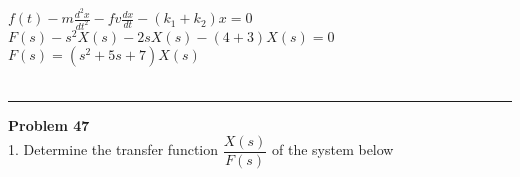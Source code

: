 \documentclass[11pt,letterpaper]{article}
\begin{document}
			$f(t)-m\frac{d^2x}{dt^2}-fv\frac{dx}{dt}-(k_1+k_2)x=0$\\

			$F(s)-s^2X(s)-2sX(s)-(4+3)X(s)=0$\\
			
			$F(s)=(s^2+5s+7)X(s)$\\
			
			\\
	
			\clearpage
			\rule{\textwidth}{1pt}
			\textbf{Problem 47}\\
			1. Determine the transfer function $\dfrac{X(s)}{F(s)}$ of the system below\\	
\end{document}
